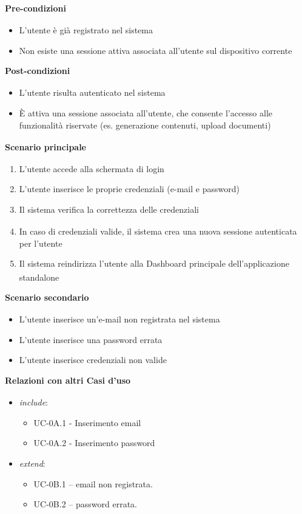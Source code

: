 ﻿\documentclass[a4paper,11pt]{article}
\begin{document}
\textbf{Pre-condizioni\textsubscript{}}
\begin{itemize}
    \item L'utente è già registrato nel sistema
    \item Non esiste una sessione attiva associata all'utente sul dispositivo corrente
\end{itemize}

\textbf{Post-condizioni\textsubscript{}}
\begin{itemize}
    \item L'utente risulta autenticato nel sistema
    \item È attiva una sessione associata all'utente, che consente l'accesso alle funzionalità\textsubscript{} riservate (es. generazione contenuti, upload documenti)
\end{itemize}

\textbf{Scenario principale\textsubscript{}}
\begin{enumerate}
    \item L'utente accede alla schermata di login
    \item L'utente inserisce le proprie credenziali (e-mail e password)
    \item Il sistema verifica\textsubscript{} la correttezza delle credenziali
    \item In caso di credenziali valide, il sistema crea una nuova sessione autenticata per l'utente
    \item Il sistema reindirizza l'utente alla Dashboard\textsubscript{} principale dell'applicazione standalone
\end{enumerate}

\textbf{Scenario secondario\textsubscript{}}
\begin{itemize}
    \item L'utente inserisce un'e-mail non registrata nel sistema
    \item L'utente inserisce una password errata
    \item L'utente inserisce credenziali non valide
\end{itemize}

\textbf{Relazioni con altri Casi d'uso\textsubscript{}}
\begin{itemize}
    \item \textit{include}:
    \begin{itemize}
        \item UC-0A.1 - Inserimento email
        \item UC-0A.2 - Inserimento password
    \end{itemize}
    \item \textit{extend}: 
    \begin{itemize}
        \item UC-0B.1 – email non registrata.
        \item UC-0B.2 – password errata.
    \end{itemize}
\end{itemize}
\end{document}
